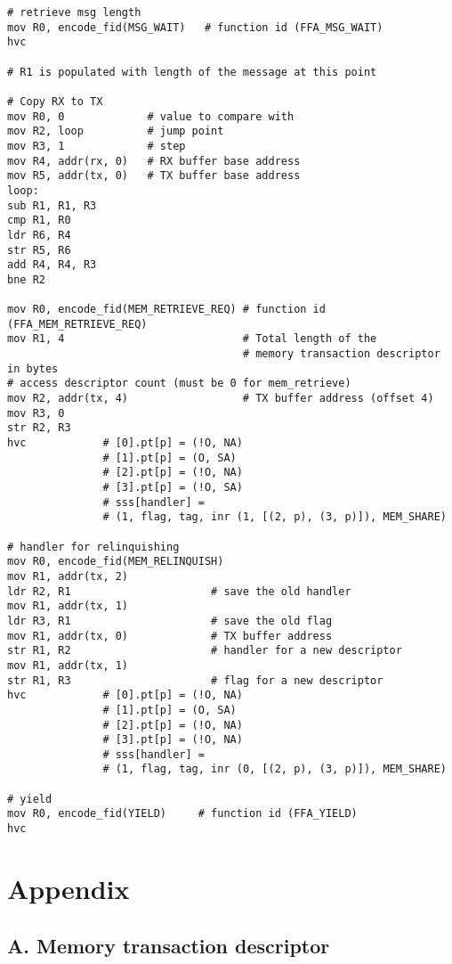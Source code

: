 \documentclass{article}
\begin{document}
\begin{lstlisting}[caption={VM 3}]
# retrieve msg length
mov R0, encode_fid(MSG_WAIT)   # function id (FFA_MSG_WAIT)
hvc

# R1 is populated with length of the message at this point

# Copy RX to TX
mov R0, 0             # value to compare with
mov R2, loop          # jump point
mov R3, 1             # step
mov R4, addr(rx, 0)   # RX buffer base address
mov R5, addr(tx, 0)   # TX buffer base address
loop:
sub R1, R1, R3
cmp R1, R0
ldr R6, R4
str R5, R6
add R4, R4, R3
bne R2

mov R0, encode_fid(MEM_RETRIEVE_REQ) # function id (FFA_MEM_RETRIEVE_REQ)
mov R1, 4                            # Total length of the  
                                     # memory transaction descriptor in bytes
# access descriptor count (must be 0 for mem_retrieve)
mov R2, addr(tx, 4)                  # TX buffer address (offset 4)
mov R3, 0
str R2, R3                                    
hvc            # [0].pt[p] = (!O, NA)
               # [1].pt[p] = (O, SA)
               # [2].pt[p] = (!O, NA)
               # [3].pt[p] = (!O, SA)
               # sss[handler] = 
               # (1, flag, tag, inr (1, [(2, p), (3, p)]), MEM_SHARE)

# handler for relinquishing
mov R0, encode_fid(MEM_RELINQUISH)
mov R1, addr(tx, 2)
ldr R2, R1                      # save the old handler
mov R1, addr(tx, 1)
ldr R3, R1                      # save the old flag
mov R1, addr(tx, 0)             # TX buffer address
str R1, R2                      # handler for a new descriptor
mov R1, addr(tx, 1)
str R1, R3                      # flag for a new descriptor
hvc            # [0].pt[p] = (!O, NA)
               # [1].pt[p] = (O, SA)
               # [2].pt[p] = (!O, NA)
               # [3].pt[p] = (!O, NA)
               # sss[handler] = 
               # (1, flag, tag, inr (0, [(2, p), (3, p)]), MEM_SHARE)

# yield
mov R0, encode_fid(YIELD)     # function id (FFA_YIELD)
hvc
\end{lstlisting}

\section*{Appendix}

\subsection*{A. Memory transaction descriptor}
\end{document}
